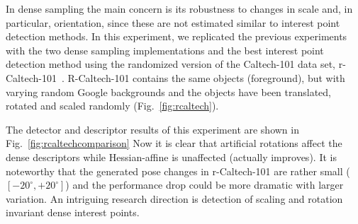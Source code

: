 \documentclass[10pt,journal,cspaper,compsoc]{IEEEtran}
\begin{document}
%
In dense sampling the main concern is its robustness to changes
in scale and, in particular, orientation, since these are not
estimated similar to interest point detection methods. In this experiment,
we replicated the previous experiments with the two dense sampling
implementations and the best interest point detection method using the
randomized version of the Caltech-101 data set, r-Caltech-101~\cite{KinKamLen:2010}.
R-Caltech-101 contains the same objects (foreground), but with varying
random Google backgrounds and the objects have been translated, rotated
and scaled randomly (Fig.~\ref{fig:rcaltech}).

The detector and descriptor results of this experiment are shown in
Fig.~\ref{fig:rcaltechcomparison} %
Now it is clear that artificial
rotations affect the dense descriptors while Hessian-affine is
unaffected (actually improves). It is noteworthy that the generated pose changes
in r-Caltech-101 are rather small ($[-20^\circ,+20^\circ]$) and
the performance drop could be more dramatic with larger variation.
An intriguing research direction is detection of scaling and
rotation invariant dense interest points.


%
%
\end{document}
